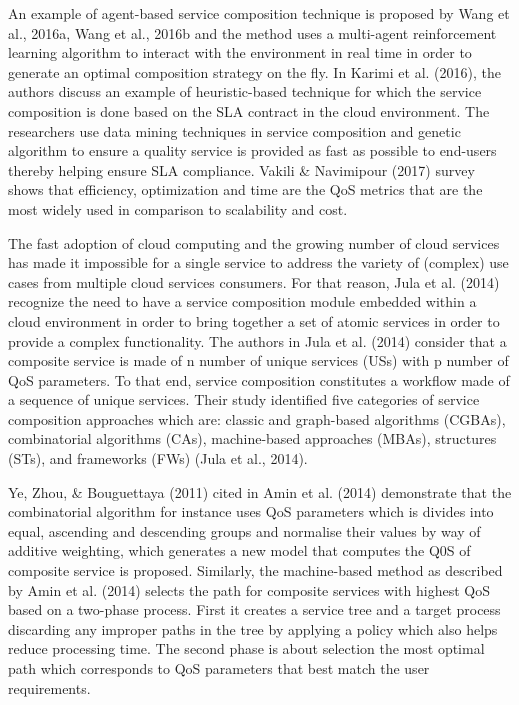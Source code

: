 \documentclass{article}
\begin{document}
\begin{multicols}{2}
An example of agent-based service composition technique is proposed by Wang et al., 2016a, Wang et al., 2016b and the method uses a multi-agent reinforcement learning algorithm to interact with the environment in real time in order to generate an optimal composition strategy on the fly.
In Karimi et al. (2016), the authors discuss an example of heuristic-based technique for which the service composition is done based on the SLA contract in the cloud environment. The researchers use data mining techniques in service composition and genetic algorithm to ensure a quality service is provided as fast as possible to end-users thereby helping ensure SLA compliance. Vakili \& Navimipour (2017) survey shows that efficiency, optimization and time are the QoS metrics that are the most widely used in comparison to scalability and cost.

The fast adoption of cloud computing and the growing number of cloud services has made it impossible for a single service to address the variety of (complex) use cases from multiple cloud services consumers. For that reason, Jula et al. (2014) recognize the need to have a service composition module embedded within a cloud environment in order to bring together a set of atomic services in order to provide a complex functionality. The authors in Jula et al. (2014) consider that a composite service is made of n number of unique services (USs) with p number of QoS parameters. To that end, service composition constitutes a workflow made of a sequence of unique services. Their study identified five categories of service composition approaches which are: classic and graph-based algorithms (CGBAs), combinatorial algorithms (CAs), machine-based approaches (MBAs), structures (STs), and frameworks (FWs) (Jula et al., 2014).

Ye, Zhou, \& Bouguettaya (2011) cited in Amin et al. (2014) demonstrate that the combinatorial algorithm for instance uses QoS parameters which is divides into equal, ascending and descending groups and normalise their values by way of additive weighting, which generates a new model that computes the Q0S of composite service is proposed. Similarly, the machine-based method as described by Amin et al. (2014) selects the path for composite services with highest QoS based on a two-phase process. First it creates a service tree and a target process discarding any improper paths in the tree by applying a policy which also helps reduce processing time. The second phase is about selection the most optimal path which corresponds to QoS parameters that best match the user requirements. 


\end{multicols}
\end{document}
